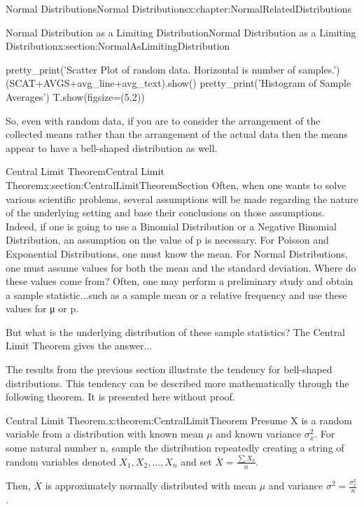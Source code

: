 \documentclass[oneside,10pt,]{book}
\numberwithin{equation}{section}
\begin{document}
\begin{chapterptx}{Normal Distributions}{}{Normal Distributions}{}{}{x:chapter:NormalRelatedDistributions}
\begin{sectionptx}{Normal Distribution as a Limiting Distribution}{}{Normal Distribution as a Limiting Distribution}{}{}{x:section:NormalAsLimitingDistribution}
\begin{sageinput}
    pretty_print('Scatter Plot of random data.  Horizontal is number of samples.')
    (SCAT+AVGS+avg_line+avg_text).show()
    pretty_print('Histogram of Sample Averages')
    T.show(figsize=(5,2))
\end{sageinput}
%
\par
So, even with random data, if you are to consider the arrangement of the collected means rather than the arrangement of the actual data then the means appear to have a bell-shaped distribution as well.%
\end{sectionptx}
%
%
\typeout{************************************************}
\typeout{************************************************}
%
\begin{sectionptx}{Central Limit Theorem}{}{Central Limit Theorem}{}{}{x:section:CentralLimitTheoremSection}
Often, when one wants to solve various scientific problems, several assumptions will be made regarding the nature of the underlying setting and base their conclusions on those assumptions.  Indeed, if one is going to use a Binomial Distribution or a Negative Binomial Distribution, an assumption on the value of p is necessary.  For Poisson and Exponential Distributions, one must know the mean.  For Normal Distributions, one must assume values for both the mean and the standard deviation.   Where do these values come from?  Often, one may perform a preliminary study and obtain a sample statistic...such as a sample mean or a relative frequency and use these values for μ or p.%
\par
But what is the underlying distribution of these sample statistics?  The Central Limit Theorem gives the answer...%
\par
The results from the previous section illustrate the tendency for bell-shaped distributions. This tendency can be described more mathematically through the following theorem. It is presented here without proof.%
\par
\begin{theorem}{Central Limit Theorem.}{}{x:theorem:CentralLimitTheorem}%
Presume X is a random variable from a distribution with known mean \(\mu\) and known variance \(\sigma_x^2\). For some natural number n, sample the distribution repeatedly creating a string of random variables denoted \(X_1, X_2, ... , X_n\) and set \(\overline{X} = \frac{\sum X_k}{n}\).%
\par
Then, \(\overline{X}\) is approximately normally distributed with mean \(\mu\) and variance \(\sigma^2 = \frac{\sigma_x^2}{n}\).%

\end{theorem}
\end{sectionptx}
\end{chapterptx}
\end{document}
